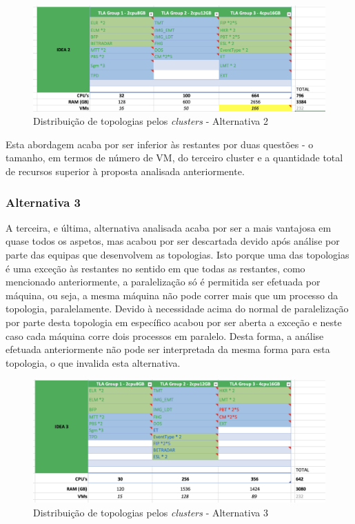 \begin{figure}[H]
  \centerline{\includegraphics[scale=0.4]{media/content/analise/proposal-2.png}}
  \caption{Distribuição de topologias pelos \textit{clusters} - Alternativa 2}
  \label{proposal-2}
\end{figure}

Esta abordagem acaba por ser inferior às restantes por duas questões - o tamanho, em termos de número 
de \ac{VM}, do terceiro \gls{cluster} e a quantidade total de recursos superior à proposta
analisada anteriormente.

\subsubsection{Alternativa 3}

A terceira, e última, alternativa analisada acaba por ser a mais vantajosa em quase todos os 
aspetos, mas acabou por ser descartada devido após análise por parte das equipas que desenvolvem as 
topologias. Isto porque uma das topologias é uma exceção às restantes no sentido em que todas as
restantes, como mencionado anteriormente, a paralelização só é permitida ser efetuada por máquina, 
ou seja, a mesma máquina não pode correr mais que um processo da topologia, paralelamente.
Devido à necessidade acima do normal de paralelização por parte desta topologia em específico
acabou por ser aberta a exceção e neste caso cada máquina corre dois processos em paralelo.
Desta forma, a análise efetuada anteriormente não pode ser interpretada da mesma forma para esta
topologia, o que invalida esta alternativa.

\begin{figure}[H]
  \centerline{\includegraphics[scale=0.4]{media/content/analise/proposal-3.png}}
  \caption{Distribuição de topologias pelos \textit{clusters} - Alternativa 3}
  \label{proposal-3}
\end{figure}

